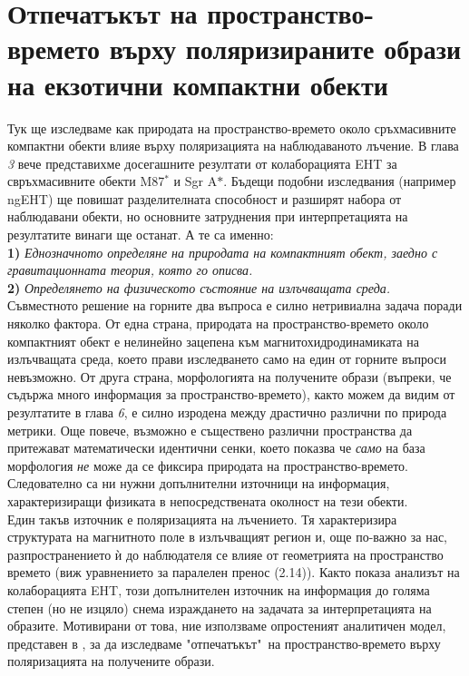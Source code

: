 \section{Отпечатъкът на пространство-времето върху поляризираните образи на екзотични компактни обекти}
Тук ще изследваме как природата на пространство-времето около сръхмасивните компактни обекти влияе върху поляризацията на наблюдаваното лъчение. В глава \emph{3} вече представихме досегашните резултати от колаборацията EHT за свръхмасивните обекти M87$^*$ и Sgr A$*$. Бъдещи подобни изследвания (например ngEHT) ще повишат разделителната способност и разширят набора от наблюдавани обекти, но основните затруднения при интерпретацията на резултатите винаги ще останат. А те са именно:\\

\textbf{1)} \emph{Еднозначното определяне на природата на компактният обект, заедно с гравитационната теория, която го описва.}\\

\textbf{2)} \emph{Определянето на физическото състояние на излъчващата среда.}\\

Съвместното решение на горните два въпроса е силно нетривиална задача поради няколко фактора. От една страна, природата на пространство-времето около компактният обект е нелинейно зацепена към магнитохидродинамиката на излъчващата среда, което прави изследването само на един от горните въпроси невъзможно. От друга страна, морфологията на получените образи (въпреки, че съдържа много информация за пространство-времето), както можем да видим от резултатите в глава \emph{6}, е силно изродена между драстично различни по природа метрики. Още повече, възможно е съществено различни пространства да притежават математически идентични сенки\cite{PhysRevD.103.084040}, което показва че \emph{само} на база морфология \emph{не} може да се фиксира природата на пространство-времето. Следователно са ни нужни допълнителни източници на информация, характеризиращи физиката в непосредствената околност на тези обекти. \\

Един такъв източник е поляризацията на лъчението. Тя характеризира структурата на магнитното поле в излъчващият регион и, още по-важно за нас, разпространението ѝ до наблюдателя се влияе от геометрията на пространство времето (виж уравнението за паралелен пренос (2.14)). Както показа анализът на колаборацията EHT, този допълнителен източник на информация до голяма степен (но не изцяло) снема израждането на задачата за интерпретацията на образите. Мотивирани от това, ние използваме опростеният аналитичен модел, представен в \cite{Narayan2021}, за да изследваме "отпечатъкът"$\,$ на пространство-времето върху поляризацията на получените образи.\\

